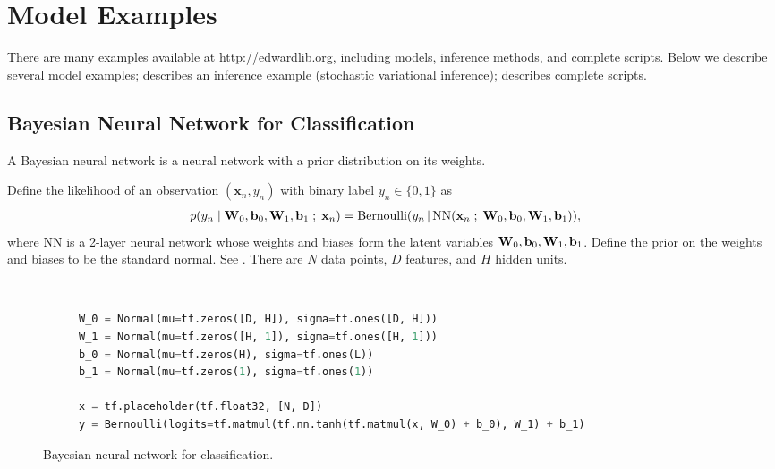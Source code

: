 \section{Model Examples}
\label{appendix:model}

There are many examples available at \url{http://edwardlib.org},
including models, inference methods, and complete scripts.
Below we describe several model examples; 
describes an inference example (stochastic variational inference);
 describes complete scripts.

\subsection{Bayesian Neural Network for Classification}
\label{appendix:bnn}

A Bayesian neural network is a neural network with a prior
distribution on its weights.

Define the likelihood of an observation $(\mathbf{x}_n, y_n)$ with
binary label $y_n\in\{0,1\}$ as
\begin{align*}
  p(y_n \mid \boldsymbol{\mathbf{W}}_0, \boldsymbol{\mathbf{b}}_0, \boldsymbol{\mathbf{W}}_1, \boldsymbol{\mathbf{b}}_1 \;;\; \mathbf{x}_n)
  &=
  \operatorname{Bernoulli}(y_n \,|\, \mathrm{NN}(\mathbf{x}_n\;;\;
  \boldsymbol{\mathbf{W}}_0, \boldsymbol{\mathbf{b}}_0, \boldsymbol{\mathbf{W}}_1, \boldsymbol{\mathbf{b}}_1)),
\end{align*}
where $\mathrm{NN}$ is a 2-layer neural network whose weights and biases form
the latent variables $\boldsymbol{\mathbf{W}}_0, \boldsymbol{\mathbf{b}}_0, \boldsymbol{\mathbf{W}}_1, \boldsymbol{\mathbf{b}}_1$.
%
Define the prior on the weights and biases to be the standard normal.
See . There are $N$ data points, $D$ features, and $H$
hidden units.

\begin{figure}[tb]
\begin{subfigure}{\columnwidth}
  \centering
  
\end{subfigure}%
\\
\begin{subfigure}{\columnwidth}
\begin{lstlisting}[language=python]
W_0 = Normal(mu=tf.zeros([D, H]), sigma=tf.ones([D, H]))
W_1 = Normal(mu=tf.zeros([H, 1]), sigma=tf.ones([H, 1]))
b_0 = Normal(mu=tf.zeros(H), sigma=tf.ones(L))
b_1 = Normal(mu=tf.zeros(1), sigma=tf.ones(1))

x = tf.placeholder(tf.float32, [N, D])
y = Bernoulli(logits=tf.matmul(tf.nn.tanh(tf.matmul(x, W_0) + b_0), W_1) + b_1)
\end{lstlisting}
\end{subfigure}
\caption{Bayesian neural network for classification.}
\label{fig:bnn}
\end{figure}

